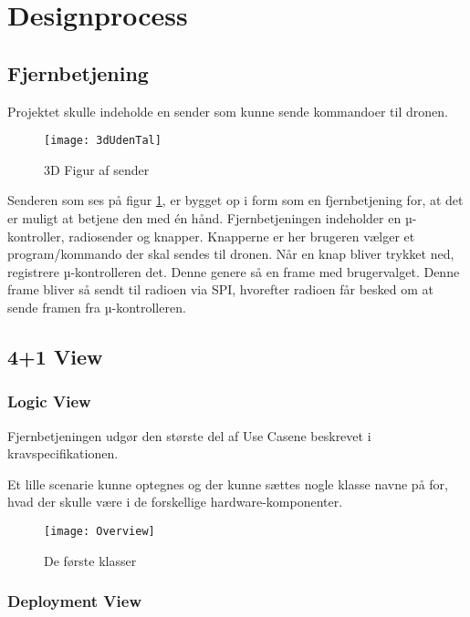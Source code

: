 \documentclass[Main]{subfiles}
\begin{document}
\section{Designprocess}

\subsection{Fjernbetjening}

Projektet skulle indeholde en sender som kunne sende kommandoer til dronen.

\begin{figure}[H]
\centering
\texttt{[image: 3dUdenTal]}
\caption{3D Figur af sender}
\label{Fig:3dUdenTal}
\end{figure}


Senderen som ses på figur \ref{Fig:3dUdenTal}, er bygget op i form som en fjernbetjening for, at det er muligt at betjene den med én hånd.
Fjernbetjeningen indeholder en µ-kontroller, radiosender og knapper.
Knapperne er her brugeren vælger et program/kommando der skal sendes til dronen. Når en knap bliver trykket ned, registrere µ-kontrolleren det. Denne genere så en frame med brugervalget. Denne frame bliver så sendt til radioen via SPI, hvorefter radioen får besked om at sende framen fra µ-kontrolleren.

\subsection{4+1 View}


\subsubsection*{Logic View}

Fjernbetjeningen udgør den største del af Use Casene beskrevet i kravspecifikationen\cite[s. 7 -- 11]{Kravspec}.

Et lille scenarie kunne optegnes og der kunne sættes nogle klasse navne på for, hvad der skulle være i de forskellige hardware-komponenter.

\begin{figure}[H]
\centering
\texttt{[image: Overview]}
\caption{De første klasser}
\label{Fig:Overview}
\end{figure}

\subsubsection*{Deployment View}
\end{document}
